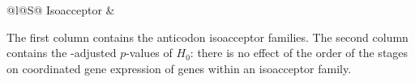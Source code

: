 \begin{table}[h!]
    \centering
    \begin{tabular}{@{}l@{}S@{}}
        \toprule
        Isoacceptor & \\
        \midrule
        
        \bottomrule
    \end{tabular}

    {The first column contains the \trna anticodon isoacceptor families. The
    second column contains the -adjusted \(p\)-values of \(H_0\):
    there is no effect of the order of the stages on coordinated gene expression
    of \trna genes within an isoacceptor family.}
\end{table}
